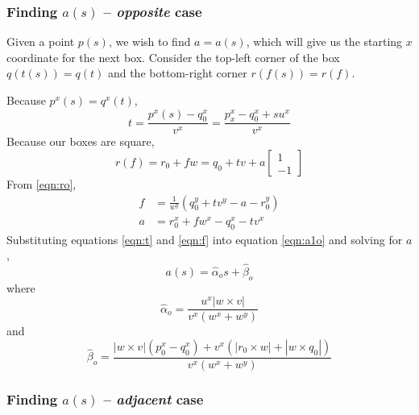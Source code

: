 \documentclass[final,3p,times,twocolumn]{elsarticle}
\begin{document}
\subsubsection{Finding $a(s)$ -- \textit{opposite} case}

Given a point $p(s)$, we wish to find $a=a(s)$, which will give us the starting $x$ coordinate for the next box. Consider the top-left corner of the box $q(t(s))=q(t)$ and the bottom-right corner $r(f(s))=r(f)$.

Because $p^x(s)=q^x(t)$,
\begin{equation}
t = \frac{p^x(s)-q_0^x}{v^x} = \frac{p_x^x-q_0^x+su^x}{v^x} \label{eqn:t}
\end{equation}
Because our boxes are square,
\begin{equation}
r(f) = r_0+fw = q_0+tv+a\begin{bmatrix}1\\-1\end{bmatrix} \label{eqn:ro}
\end{equation}
From \eqref{eqn:ro},
\begin{align}
f &= \frac{1}{w^y}(q_0^y+tv^y-a-r_0^y) \label{eqn:f} \\
a &= r_0^x+fw^x-q_0^x-tv^x \label{eqn:a1o}
\end{align}
Substituting equations \eqref{eqn:t} and \eqref{eqn:f} into equation \eqref{eqn:a1o} and solving for $a$,
\begin{equation}
a(s) = \hat{\alpha}_o s + \hat{\beta}_o \label{eqn:ao}
\end{equation}
where
\begin{equation}
\hat{\alpha}_o = \frac{u^x|w \times v|}{v^x(w^x+w^y)}
\end{equation}
and
\begin{equation}
\hat{\beta}_o = \frac{|w \times v|(p_0^x-q_0^x) + v^x(|r_0 \times w| + |w \times q_0|)}{v^x(w^x+w^y)}
\end{equation}

\subsubsection{Finding $a(s)$ -- \textit{adjacent} case}
\end{document}
